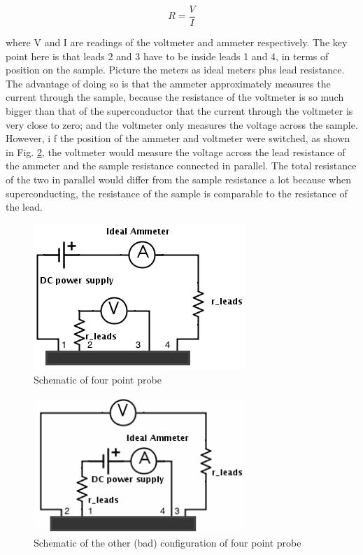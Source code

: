 \documentclass[prb,preprint]{revtex4-1}
\begin{document}
\begin{equation}
R=\frac{V}{I}
\label{ohm}
\end{equation}

where V and I are readings of the voltmeter and ammeter respectively. The key point here is that leads 2 and 3 have to be inside leads 1 and 4, in terms of position on the sample. Picture the meters as ideal meters plus lead resistance. The advantage of doing so is that the ammeter approximately measures the current through the sample, because the resistance of the voltmeter is so much bigger than that of the superconductor that the current through the voltmeter is very close to zero; and the voltmeter only measures the voltage across the sample. However, i f the position of the ammeter and voltmeter were switched, as shown in Fig. \ref{fpp2}, the voltmeter would measure the voltage across the lead resistance of the ammeter and the sample resistance connected in parallel. The total resistance of the two in parallel would differ from the sample resistance a lot because when superconducting, the resistance of the sample is comparable to the resistance of the lead. \\

\begin{figure}[h]
\centering
\includegraphics[width=8cm]{fourpointprobe2.png}
\caption{Schematic of four point probe}
\label{fpp}
\end{figure}

\begin{figure}[h]
\centering
\includegraphics[width=8cm]{fourpointprobe3.png}
\caption{Schematic of the other (bad) configuration of four point probe}
\label{fpp2}
\end{figure}
\end{document}
